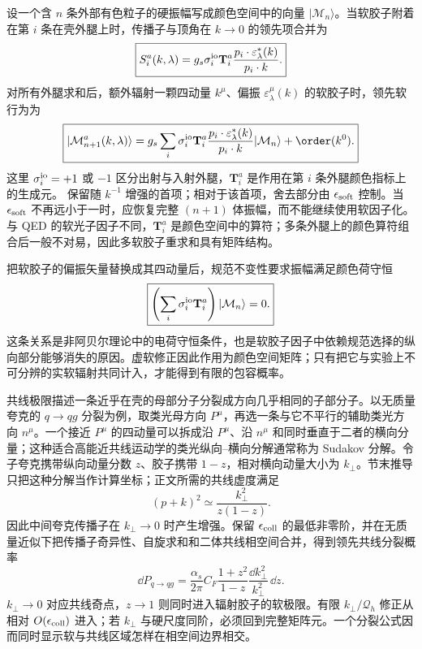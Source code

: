 设一个含 $n$ 条外部有色粒子的硬振幅写成颜色空间中的向量 $|\mathcal M_n\rangle$。当软胶子附着在第 $i$ 条在壳外腿上时，传播子与顶角在 $k\to0$ 的领先项合并为
\begin{equation}
\boxed{
 S_i^a(k,\lambda)
 =g_s\sigma_i^{\rm io}\mathbf T_i^a
 \frac{p_i\cdot\varepsilon_\lambda^*(k)}{p_i\cdot k}.}
\label{eq:qcd-soft-leg-factor-dp68}
\end{equation}
对所有外腿求和后，额外辐射一颗四动量 $k^\mu$、偏振 $\varepsilon_\lambda^\mu(k)$ 的软胶子时，领先软行为为
\begin{equation}
 \boxed{
 |\mathcal M_{n+1}^{a}(k,\lambda)\rangle
 =g_s\sum_i\sigma_i^{\rm io}
 \mathbf T_i^a
 \frac{p_i\cdot\varepsilon_\lambda^*(k)}{p_i\cdot k}
 |\mathcal M_n\rangle
 +\order(k^0).}
 \label{eq:qcd-soft-gluon-theorem-dp10}
\end{equation}
这里 $\sigma_i^{\rm io}=+1$ 或 $-1$ 区分出射与入射外腿，$\mathbf T_i^a$ 是作用在第 $i$ 条外腿颜色指标上的生成元。 保留随 $k^{-1}$ 增强的首项；相对于该首项，舍去部分由 $\epsilon_{\rm soft}$ 控制。当 $\epsilon_{\rm soft}$ 不再远小于一时，应恢复完整 $(n+1)$ 体振幅，而不能继续使用软因子化。与 QED 的软光子因子不同，$\mathbf T_i^a$ 是颜色空间中的算符；多条外腿上的颜色算符组合后一般不对易，因此多软胶子重求和具有矩阵结构。

把软胶子的偏振矢量替换成其四动量后，规范不变性要求振幅满足颜色荷守恒
\begin{equation}
 \boxed{
 \left(\sum_i\sigma_i^{\rm io}\mathbf T_i^a\right)|\mathcal M_n\rangle=0.}
 \label{eq:qcd-color-charge-conservation-amplitude-dp10}
\end{equation}
这条关系是非阿贝尔理论中的电荷守恒条件，也是软胶子因子中依赖规范选择的纵向部分能够消失的原因。虚软修正因此作用为颜色空间矩阵；只有把它与实验上不可分辨的实软辐射共同计入，才能得到有限的包容概率。

共线极限描述一条近乎在壳的母部分子分裂成方向几乎相同的子部分子。以无质量夸克的 $q\to qg$ 分裂为例，取类光母方向 $P^\mu$，再选一条与它不平行的辅助类光方向 $n^\mu$。一个接近 $P^\mu$ 的四动量可以拆成沿 $P^\mu$、沿 $n^\mu$ 和同时垂直于二者的横向分量；这种适合高能近共线运动学的类光纵向--横向分解通常称为 Sudakov 分解。令子夸克携带纵向动量分数 $z$、胶子携带 $1-z$，相对横向动量大小为 $k_\perp$。节末推导只把这种分解当作计算坐标；正文所需的共线虚度满足
\begin{equation}
\boxed{
 (p+k)^2\simeq\frac{k_\perp^2}{z(1-z)}.}
\label{eq:qcd-collinear-virtuality-dp68}
\end{equation}
因此中间夸克传播子在 $k_\perp\to0$ 时产生增强。保留 $\epsilon_{\rm coll}$ 的最低非零阶，并在无质量近似下把传播子奇异性、自旋求和和二体共线相空间合并，得到领先共线分裂概率
\begin{equation}
 \boxed{
 \dd P_{q\to qg}
 =\frac{\alpha_s}{2\pi}
 C_F\frac{1+z^2}{1-z}
 \frac{\dd k_\perp^2}{k_\perp^2}\,\dd z.}
 \label{eq:q-to-qg-splitting-probability-dp10}
\end{equation}
$k_\perp\to0$ 对应共线奇点，$z\to1$ 则同时进入辐射胶子的软极限。有限 $k_\perp/\mathcal Q_h$ 修正从相对 $O(\epsilon_{\rm coll})$ 进入；若 $k_\perp$ 与硬尺度同阶，必须回到完整矩阵元。一个分裂公式因而同时显示软与共线区域怎样在相空间边界相交。

